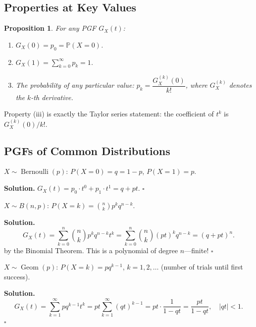 \documentclass[12pt, a4paper, oneside]{book}
\theoremstyle{definition}
\theoremstyle{plain}
\newtheorem{proposition}{Proposition}[section]
\theoremstyle{remark}
\newcommand{\Prob}{\mathbb{P}}
\newenvironment{solution}
  {\par\medskip\noindent\textbf{Solution.}\quad}
  {\hfill$\square$\par\medskip}
\begin{document}
\subsection{Properties at Key Values}

\begin{proposition}
For any PGF $G_X(t)$:
\begin{enumerate}[label=\textbf{(\roman*)}]
  \item $G_X(0) = p_0 = \Prob(X=0)$.
  \item $G_X(1) = \sum_{k=0}^\infty p_k = 1$.
  \item The probability of any particular value: $p_k = \dfrac{G_X^{(k)}(0)}{k!}$,
        where $G_X^{(k)}$ denotes the $k$-th derivative.
\end{enumerate}
\end{proposition}

Property (iii) is exactly the Taylor series statement: the coefficient of $t^k$
is $G_X^{(k)}(0)/k!$.

\subsection{PGFs of Common Distributions}

\begin{workedexample}
$X\sim\operatorname{Bernoulli}(p)$: $P(X=0)=q=1-p$, $P(X=1)=p$.

\begin{solution}
$G_X(t) = p_0\cdot t^0 + p_1\cdot t^1 = q + pt$.
\end{solution}
\end{workedexample}

\begin{workedexample}
$X\sim B(n,p)$: $P(X=k)=\binom{n}{k}p^k q^{n-k}$.

\begin{solution}
\[
  G_X(t) = \sum_{k=0}^n\binom{n}{k}p^k q^{n-k}t^k
  = \sum_{k=0}^n\binom{n}{k}(pt)^k q^{n-k}
  = (q+pt)^n.
\]
by the Binomial Theorem.  This is a polynomial of degree $n$---finite!
\end{solution}
\end{workedexample}

\begin{workedexample}
$X\sim\operatorname{Geom}(p)$: $P(X=k)=pq^{k-1}$, $k=1,2,\ldots$ (number
of trials until first success).

\begin{solution}
\[
  G_X(t) = \sum_{k=1}^\infty pq^{k-1}t^k = pt\sum_{k=1}^\infty(qt)^{k-1}
  = pt\cdot\frac{1}{1-qt} = \frac{pt}{1-qt},\quad |qt|<1.
\]
\end{solution}
\end{workedexample}
\end{document}
